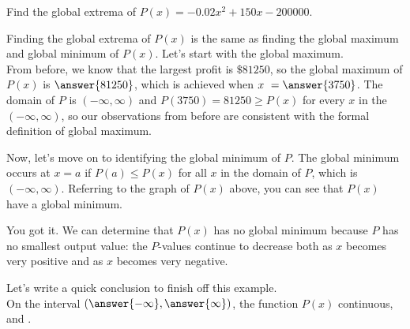 \documentclass{ximera}
\begin{document}
\begin{example}
Find the global extrema of $P(x) = -0.02x^2 + 150x-200000$.
\begin{explanation}
Finding the global extrema of $P(x)$ is the same as finding the global maximum and global minimum of $P(x)$.  Let's start with the global maximum.  \\

From before, we know that the largest profit is $\$81250$, so the global maximum of $P(x)$ is $\answer{81250}$, which is achieved when $x \ = \answer{3750}$.  The domain of $P$ is $(-\infty, \infty)$ and $P(3750) = 81250 \geq P(x)$ for every $x$ in the $(-\infty, \infty)$, so our observations from before are consistent with the formal definition of global maximum. \\

\begin{explanation}

Now, let's move on to identifying the global minimum of $P$.  The global minimum occurs at $x=a$ if $P(a) \leq P(x)$ for all $x$ in the domain of $P$, which is $(-\infty, \infty)$.  Referring to the graph of $P(x)$ above, you can see that $P(x)$  have a global minimum. 

\begin{feedback}[correct]
You got it.  We can determine that $P(x)$ has no global minimum because $P$ has no smallest output value: the $P$-values continue to decrease both as $x$ becomes very positive and as $x$ becomes very negative. 
\end{feedback}

\begin{explanation}

Let's write a quick conclusion to finish off this example. \\

On the  interval $\left( \answer{-\infty}, \answer{\infty} \right)$, the function $P(x)$  continuous, and .


\end{explanation}

\end{explanation}

\end{explanation}

\end{example}
\end{document}

